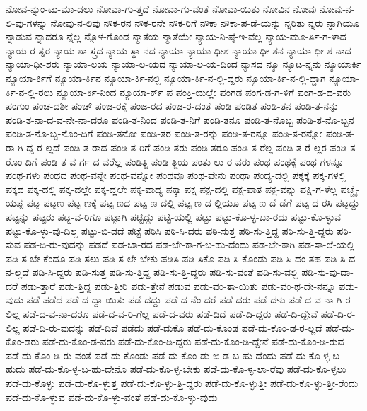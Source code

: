 {ನೋವ-ನ್ನುಂ-ಟು-ಮಾ-ಡಲು
ನೋವಾ-ಗು-ತ್ತದೆ
ನೋವಾ-ಗು-ವಂತೆ
ನೋವಾ-ಯಿತು
ನೋವಿನ
ನೋವು
ನೋವು-ನ-ಲಿ-ವು-ಗಳನ್ನು
ನೋವು-ನ-ಲಿವು
ನೌಕ-ರನ
ನೌಕ-ರನೇ
ನೌಕ-ರಿಗೆ
ನೌಕಾ
ನೌಕಾ-ಪ-ಡೆ-ಯನ್ನು
ನ್ನರಿತು
ನ್ನರು
ನ್ನಾಗಿಯೂ
ನ್ನಾಡುವ
ನ್ನಾದರೂ
ನ್ನೆಲ್ಲ
ನ್ನೊಳ-ಗೊಂಡ
ನ್ಮಾತೆಯ
ನ್ಮಾತೆಯೇ
ನ್ಯಾಯ-ನಿ-ಷ್ಠೆ-ಇ-ವೆಲ್ಲ
ನ್ಯಾಯ-ಮೂ-ರ್ತಿ-ಗ-ಳಾದ
ನ್ಯಾಯ-ರ-ತ್ನರ
ನ್ಯಾಯ-ಶಾ-ಸ್ತ್ರದ
ನ್ಯಾಯ-ಸ್ಥಾ-ನದ
ನ್ಯಾಯಾ
ನ್ಯಾಯಾ-ಧೀಶ
ನ್ಯಾಯಾ-ಧೀ-ಶನ
ನ್ಯಾಯಾ-ಧೀ-ಶ-ನಾದ
ನ್ಯಾಯಾ-ಧೀ-ಶರು
ನ್ಯಾಯಾ-ಲಯ
ನ್ಯಾಯಾ-ಲ-ಯದ
ನ್ಯಾಯಾ-ಲ-ಯ-ದಿಂದ
ನ್ಯಾಸದ
ನ್ಯೂ
ನ್ಯೂಟ-ನ್ನನು
ನ್ಯೂಯಾರ್ಕಿ
ನ್ಯೂಯಾ-ರ್ಕಿಗೆ
ನ್ಯೂಯಾ-ರ್ಕಿನ
ನ್ಯೂಯಾ-ರ್ಕಿ-ನಲ್ಲಿ
ನ್ಯೂಯಾ-ರ್ಕಿ-ನ-ಲ್ಲಿ-ದ್ದರು
ನ್ಯೂಯಾ-ರ್ಕಿ-ನ-ಲ್ಲಿ-ದ್ದಾಗ
ನ್ಯೂಯಾ-ರ್ಕಿ-ನ-ಲ್ಲಿ-ರಲು
ನ್ಯೂಯಾ-ರ್ಕಿ-ನಿಂದ
ನ್ಯೂಯಾ-ರ್ಕ್
ಪ
ಪಂಕ್ತಿ-ಯಲ್ಲೇ
ಪಂಗಡ
ಪಂಗ-ಡ-ಗ-ಳಿಗೆ
ಪಂಗ-ಡ-ದ-ವರು
ಪಂಗುಂ
ಪಂಚ-ದಶೀ
ಪಂಚ್
ಪಂಜ-ರಕ್ಕೆ
ಪಂಜ-ರದ
ಪಂಜ-ರ-ದಂತೆ
ಪಂಡಿ
ಪಂಡಿತ
ಪಂಡಿ-ತನ
ಪಂಡಿ-ತ-ನನ್ನು
ಪಂಡಿ-ತ-ನಾ-ದ-ವ-ನೇ-ನಾ-ದರೂ
ಪಂಡಿ-ತ-ನಿಂದ
ಪಂಡಿ-ತ-ನಿಗೆ
ಪಂಡಿ-ತನೂ
ಪಂಡಿ-ತ-ನೊಬ್ಬ
ಪಂಡಿ-ತ-ನೊ-ಬ್ಬನ
ಪಂಡಿ-ತ-ನೊ-ಬ್ಬ-ನೊಂ-ದಿಗೆ
ಪಂಡಿ-ತನೋ
ಪಂಡಿ-ತರ
ಪಂಡಿ-ತ-ರನ್ನು
ಪಂಡಿ-ತ-ರನ್ನೂ
ಪಂಡಿ-ತ-ರನ್ನೋ
ಪಂಡಿ-ತ-ರಾ-ಗಿ-ದ್ದ-ರ-ಲ್ಲದೆ
ಪಂಡಿ-ತ-ರಾದ
ಪಂಡಿ-ತ-ರಿಗೆ
ಪಂಡಿ-ತರು
ಪಂಡಿ-ತರೂ
ಪಂಡಿ-ತ-ರೆಲ್ಲ
ಪಂಡಿ-ತ-ರೆ-ಲ್ಲರ
ಪಂಡಿ-ತ-ರೊಂ-ದಿಗೆ
ಪಂಡಿ-ತ-ವ-ರ್ಗ-ದ-ವರೆಲ್ಲ
ಪಂಡಿತ್ಜಿ
ಪಂಡಿ-ತ್ಜಿಯ
ಪಂತು-ಲು-ರ-ವರು
ಪಂಥ
ಪಂಥಕ್ಕೆ
ಪಂಥ-ಗಳನ್ನೂ
ಪಂಥ-ಗಳು
ಪಂಥದ
ಪಂಥ-ವನ್ನೇ
ಪಂಥ-ವನ್ನೋ
ಪಂಥವೂ
ಪಂಥ-ವೇನು
ಪಂಥಾ
ಪಂದ್ಯ-ದಲ್ಲಿ
ಪಕ್ಕಕ್ಕೆ
ಪಕ್ಕ-ಗಳಲ್ಲಿ
ಪಕ್ಕದ
ಪಕ್ಕ-ದಲ್ಲಿ
ಪಕ್ಕ-ದಲ್ಲೇ
ಪಕ್ಕ-ದ್ಲಲೇ
ಪಕ್ಕ-ವಾದ್ಯ
ಪಕ್ಕಾ
ಪಕ್ಷ
ಪಕ್ಷ-ದಲ್ಲಿ
ಪಕ್ಷ-ಪಾತ
ಪಕ್ಷ-ವನ್ನು
ಪಕ್ಷಿ-ಗ-ಳೆಲ್ಲ
ಪಚ್ಚೈ-ಯಪ್ಪ
ಪಟ್ಟ
ಪಟ್ಟಣ
ಪಟ್ಟ-ಣಕ್ಕೆ
ಪಟ್ಟ-ಣದ
ಪಟ್ಟ-ಣ-ದಲ್ಲಿ
ಪಟ್ಟ-ಣ-ದ-ಲ್ಲಿಯೂ
ಪಟ್ಟ-ಣ-ದೆ-ಡೆಗೆ
ಪಟ್ಟ-ದ-ರಸಿ
ಪಟ್ಟದ್ದು
ಪಟ್ಟನ್ನು
ಪಟ್ಟರು
ಪಟ್ಟ-ವ-ರಿಗೂ
ಪಟ್ಟಾಗಿ
ಪಟ್ಟಿದ್ದು
ಪಟ್ಟಿ-ಯಲ್ಲಿ
ಪಟ್ಟು
ಪಟ್ಟು-ಕೊ-ಳ್ಳ-ಬಾ-ರದು
ಪಟ್ಟು-ಕೊ-ಳ್ಳುವ
ಪಟ್ಟು-ಕೊ-ಳ್ಳು-ವು-ದಿಲ್ಲ
ಪಟ್ಟು-ಬಿ-ಡದೆ
ಪಟ್ಟೆ
ಪಠಿಸಿ
ಪಠಿ-ಸಿ-ದರು
ಪಠಿ-ಸುತ್ತ
ಪಠಿ-ಸು-ತ್ತಿದ್ದ
ಪಠಿ-ಸು-ತ್ತಿ-ದ್ದರು
ಪಠಿ-ಸುವ
ಪಡ-ದಿ-ರು-ವುದನ್ನು
ಪಡದೆ
ಪಡ-ಬಾ-ರದ
ಪಡ-ಬೇ-ಕಾ-ಗ-ಬ-ಹು-ದೆಂದು
ಪಡ-ಬೇ-ಕಾಗಿ
ಪಡ-ಸಾ-ಲೆ-ಯಲ್ಲಿ
ಪಡಿ-ಸ-ಬೇ-ಕೆಂದೂ
ಪಡಿ-ಸಲು
ಪಡಿ-ಸ-ಲೇ-ಬೇಕು
ಪಡಿಸಿ
ಪಡಿ-ಸಿಕೊ
ಪಡಿ-ಸಿ-ಕೊಂಡು
ಪಡಿ-ಸಿ-ದಂ-ತಹ
ಪಡಿ-ಸಿ-ದ-ನ-ಲ್ಲದೆ
ಪಡಿ-ಸಿ-ದ್ದರು
ಪಡಿ-ಸುತ್ತ
ಪಡಿ-ಸು-ತ್ತಿದ್ದ
ಪಡಿ-ಸು-ತ್ತಿ-ದ್ದರು
ಪಡಿ-ಸು-ವಂತೆ
ಪಡಿ-ಸು-ವಲ್ಲಿ
ಪಡಿ-ಸು-ವು-ದಾ-ದರೆ
ಪಡು-ತ್ತಾರೆ
ಪಡು-ತ್ತಿದ್ದ
ಪಡು-ತ್ತೀರಿ
ಪಡು-ತ್ತೇನೆ
ಪಡುವ
ಪಡು-ವಂ-ತಾ-ಯಿತು
ಪಡು-ವಂ-ಥ-ದೇ-ನನ್ನೂ
ಪಡು-ವುದು
ಪಡೆ
ಪಡೆದ
ಪಡೆ-ದ-ದ್ದಾ-ಯಿತು
ಪಡೆ-ದದ್ದು
ಪಡೆ-ದ-ನೆಂ-ದರೆ
ಪಡೆ-ದರು
ಪಡೆ-ದಳು
ಪಡೆ-ದ-ವ-ನಾ-ಗಿ-ರ-ಲಿಲ್ಲ
ಪಡೆ-ದ-ವ-ನಾ-ದರೂ
ಪಡೆ-ದ-ವ-ರಿ-ಗೆಲ್ಲ
ಪಡೆ-ದ-ವರು
ಪಡೆ-ದಿದೆ
ಪಡೆ-ದಿ-ದ್ದರು
ಪಡೆ-ದಿ-ದ್ದೇವೆ
ಪಡೆ-ದಿ-ರ-ಲಿಲ್ಲ
ಪಡೆ-ದಿ-ರು-ವುದನ್ನು
ಪಡೆ-ದಿವೆ
ಪಡೆದು
ಪಡೆ-ದುಕೊ
ಪಡೆ-ದು-ಕೊಂಡ
ಪಡೆ-ದು-ಕೊಂ-ಡ-ರ-ಲ್ಲದೆ
ಪಡೆ-ದು-ಕೊಂ-ಡರು
ಪಡೆ-ದು-ಕೊಂ-ಡ-ವರು
ಪಡೆ-ದು-ಕೊಂ-ಡಿ-ದ್ದರು
ಪಡೆ-ದು-ಕೊಂ-ಡಿ-ದ್ದೇನೆ
ಪಡೆ-ದು-ಕೊಂ-ಡಿ-ರುವ
ಪಡೆ-ದು-ಕೊಂ-ಡಿ-ರು-ವಂತೆ
ಪಡೆ-ದು-ಕೊಂಡು
ಪಡೆ-ದು-ಕೊಂ-ಡು-ಬಿ-ಡ-ಬ-ಹು-ದೆಂದು
ಪಡೆ-ದು-ಕೊ-ಳ್ಳ-ಬ-ಹುದು
ಪಡೆ-ದು-ಕೊ-ಳ್ಳ-ಬ-ಹು-ದೇನೊ
ಪಡೆ-ದು-ಕೊ-ಳ್ಳ-ಬೇಕು
ಪಡೆ-ದು-ಕೊ-ಳ್ಳ-ಲಾ-ರೆವು
ಪಡೆ-ದು-ಕೊ-ಳ್ಳಲು
ಪಡೆ-ದು-ಕೊಳ್ಳು
ಪಡೆ-ದು-ಕೊ-ಳ್ಳುತ್ತ
ಪಡೆ-ದು-ಕೊ-ಳ್ಳು-ತ್ತಿ-ದ್ದರು
ಪಡೆ-ದು-ಕೊ-ಳ್ಳುತ್ತೀ
ಪಡೆ-ದು-ಕೊ-ಳ್ಳು-ತ್ತೀ-ರೆಂದು
ಪಡೆ-ದು-ಕೊ-ಳ್ಳುವ
ಪಡೆ-ದು-ಕೊ-ಳ್ಳು-ವಂತೆ
ಪಡೆ-ದು-ಕೊ-ಳ್ಳು-ವುದು
}
